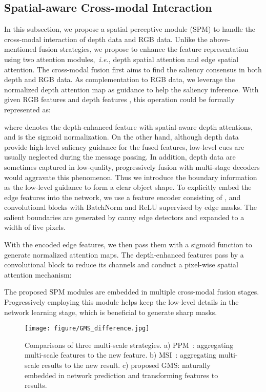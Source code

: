 \documentclass[journal]{IEEEtran}
\def\ie{{\em i.e.}}
\begin{document}
\subsection{Spatial-aware Cross-modal Interaction}
In this subsection, we propose a spatial perceptive module (SPM) to handle the cross-modal interaction of depth data and RGB data.
Unlike the above-mentioned fusion strategies, we propose to enhance the feature representation using two attention modules,~\ie, depth spatial attention and edge spatial attention.
The cross-modal fusion first aims to find the saliency consensus in both depth and RGB data. As complementation to RGB data, we leverage the normalized depth attention map as guidance to help the saliency inference. With given RGB features  and depth features , this operation could be formally represented as:

where  denotes the depth-enhanced feature with spatial-aware depth attentions, and  is the sigmoid normalization.
On the other hand, although depth data provide high-level saliency guidance for the fused features, low-level cues are usually neglected during the message passing. In addition, depth data are sometimes captured in low-quality, progressively fusion with multi-stage decoders would aggravate this phenomenon. Thus we introduce the boundary information as the low-level guidance to form a clear object shape. To explicitly embed the edge features into the network, we use a feature encoder  consisting of ,  and  convolutional blocks with BatchNorm and ReLU supervised by edge masks. The salient boundaries are generated by canny edge detectors and expanded to a width of five pixels.

With the encoded edge features, we then pass them with a sigmoid function to generate normalized attention maps. The depth-enhanced features  pass by a convolutional block  to reduce its channels and conduct a pixel-wise spatial attention mechanism:

The proposed SPM modules are embedded in multiple cross-modal fusion stages. Progressively employing this module helps keep the low-level details in the network learning stage, which is beneficial to generate sharp masks.









\begin{figure}[t]
\begin{center}
\texttt{[image: figure/GMS\_difference.jpg]}
		\caption{Comparisons of three multi-scale strategies. a) PPM~\cite{zhao2017pyramid}: aggregating multi-scale features to the new feature.  b) MSI~\cite{chen2016attention}: aggregating multi-scale results to the new result. c) proposed GMS: naturally embedded in network prediction and transforming features to results.}\label{fig:GMS difference}
	\end{center}
\end{figure}
\end{document}
